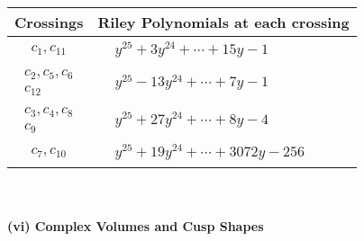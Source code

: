 \documentclass[1p]{elsarticle_modified}
\theoremstyle{definition}
\begin{document}
\begin{tabular}{m{50pt}|m{274pt}}
Crossings & \hspace{64pt}Riley Polynomials at each crossing \\
\hline $$\begin{aligned}c_{1},c_{11}\end{aligned}$$&$\begin{aligned}
&y^{25}+3 y^{24}+\cdots+15 y-1
\end{aligned}$\\
\hline $$\begin{aligned}c_{2},c_{5},c_{6}\\c_{12}\end{aligned}$$&$\begin{aligned}
&y^{25}-13 y^{24}+\cdots+7 y-1
\end{aligned}$\\
\hline $$\begin{aligned}c_{3},c_{4},c_{8}\\c_{9}\end{aligned}$$&$\begin{aligned}
&y^{25}+27 y^{24}+\cdots+8 y-4
\end{aligned}$\\
\hline $$\begin{aligned}c_{7},c_{10}\end{aligned}$$&$\begin{aligned}
&y^{25}+19 y^{24}+\cdots+3072 y-256
\end{aligned}$\\
\hline
\end{tabular}\\~\\
\newpage\flushleft \textbf{(vi) Complex Volumes and Cusp Shapes}
\end{document}
